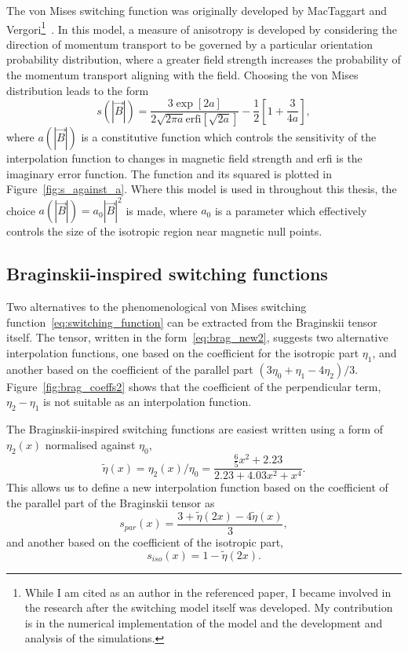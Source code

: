 The von Mises switching function was originally developed by MacTaggart and Vergori\footnote{While I am cited as an author in the referenced paper, I became involved in the research after the switching model itself was developed. My contribution is in the numerical implementation of the model and the development and analysis of the simulations.}~\cite{mactaggartBraginskiiMagnetohydrodynamicsArbitrary2017}. In this model, a measure of anisotropy is developed by considering the direction of momentum transport to be governed by a particular orientation probability distribution, where a greater field strength increases the probability of the momentum transport aligning with the field. Choosing the von Mises distribution leads to the form
\begin{equation}
  \label{eq:switching_function}
s(|\vec{B}|) = \frac{3 \exp[2a]}{2\sqrt{2\pi a} \text{erfi}[\sqrt{2a}]} - \frac{1}{2}\left[ 1 + \frac{3}{4a} \right],
\end{equation}
where $a(|\vec{B}|)$ is a constitutive function which controls the sensitivity of the interpolation function to changes in magnetic field strength and erfi is the imaginary error function. The function and its squared is plotted in Figure~\ref{fig:s_against_a}. Where this model is used in throughout this thesis, the choice $a(|\vec{B}|) = a_0 |\vec{B}|^2$ is made, where $a_0$ is a parameter which effectively controls the size of the isotropic region near magnetic null points. 

\subsection{Braginskii-inspired switching functions}

Two alternatives to the phenomenological von Mises switching function~\ref{eq:switching_function} can be extracted from the Braginskii tensor itself. The tensor, written in the form~\ref{eq:brag_new2}, suggests two alternative interpolation functions, one based on the coefficient for the isotropic part $\eta_1$, and another based on the coefficient of the parallel part $(3\eta_0+\eta_1-4\eta_2)/3$. Figure~\ref{fig:brag_coeffs2} shows that the coefficient of the perpendicular term, $\eta_2 - \eta_1$ is not suitable as an interpolation function.

The Braginskii-inspired switching functions are easiest written using a form of $\eta_2(x)$ normalised against $\eta_0$,
\begin{equation}
  \label{eq:eta_function}
  \tilde{\eta}(x) = \eta_2(x)/\eta_0 = \frac{\tfrac{6}{5}x^2 + 2.23}{2.23 + 4.03 x^2 + x^4}.
\end{equation}
This allows us to define a new interpolation function based on the coefficient of the parallel part of the Braginskii tensor as
\begin{equation}
  \label{eq:alt_switching1}
s_{par}(x) = \frac{3+\tilde{\eta}(2x)-4\tilde{\eta}(x)}{3},
\end{equation}
and another based on the coefficient of the isotropic part,
\begin{equation}
  \label{eq:alt_switching2}
s_{iso}(x) = 1 - \tilde{\eta}(2x).
\end{equation}

